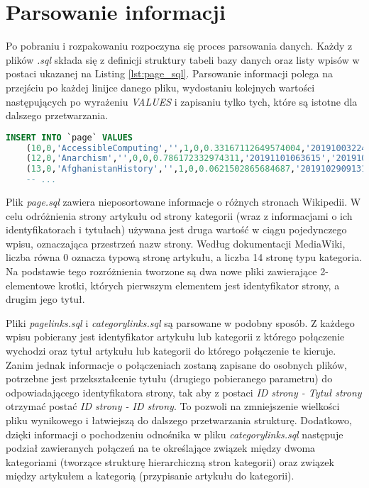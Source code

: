 \section{Parsowanie informacji}
\label{sec:data-parsing}
Po pobraniu i rozpakowaniu rozpoczyna się proces parsowania danych. Każdy z plików \textit{.sql} składa się z definicji struktury tabeli bazy danych oraz listy wpisów w postaci ukazanej na Listing \ref{lst:page_sql}. Parsowanie informacji polega na przejściu po każdej linijce danego pliku, wydostaniu kolejnych wartości następujących po wyrażeniu \textit{VALUES} i zapisaniu tylko tych, które są istotne dla dalszego przetwarzania.

\begin{lstlisting}[language=SQL,frame=single,caption={Fragment pliku enwiki-20191101-page.sql zawierający dane o stronach},label=lst:page_sql]
INSERT INTO `page` VALUES
    (10,0,'AccessibleComputing','',1,0,0.33167112649574004,'20191003224230','20190105021557',854851586,94,'wikitext',NULL),
    (12,0,'Anarchism','',0,0,0.786172332974311,'20191101063615','20191031183024',923631615,104479,'wikitext',NULL),
    (13,0,'AfghanistanHistory','',1,0,0.0621502865684687,'20191029091312','20190618192734',783865149,90,'wikitext',NULL),
    -- ...
\end{lstlisting}

Plik \textit{page.sql} zawiera nieposortowane informacje o różnych stronach Wikipedii. W celu odróżnienia strony artykułu od strony kategorii (wraz z informacjami o ich identyfikatorach i tytułach) używana jest druga wartość w ciągu pojedynczego wpisu, oznaczająca przestrzeń nazw strony. Według dokumentacji MediaWiki, liczba równa 0 oznacza typową stronę artykułu, a liczba 14 stronę typu kategoria. Na podstawie tego rozróżnienia tworzone są dwa nowe pliki zawierające 2-elementowe krotki, których pierwszym elementem jest identyfikator strony, a drugim jego tytuł.

Pliki \textit{pagelinks.sql} i \textit{categorylinks.sql} są parsowane w podobny sposób. Z każdego wpisu pobierany jest identyfikator artykułu lub kategorii z którego połączenie wychodzi oraz tytuł artykułu lub kategorii do którego połączenie te kieruje. Zanim jednak informacje o połączeniach zostaną zapisane do osobnych plików, potrzebne jest przekształcenie tytułu (drugiego pobieranego parametru) do odpowiadającego identyfikatora strony, tak aby z postaci \textit{ID strony - Tytuł strony} otrzymać postać \textit{ID strony - ID strony}. To pozwoli na zmniejszenie wielkości pliku wynikowego i łatwiejszą do dalszego przetwarzania strukturę. Dodatkowo, dzięki informacji o pochodzeniu odnośnika w pliku \textit{categorylinks.sql} następuje podział zawieranych połączeń na te określające związek między dwoma kategoriami (tworzące strukturę hierarchiczną stron kategorii) oraz związek między artykułem a kategorią (przypisanie artykułu do kategorii).

